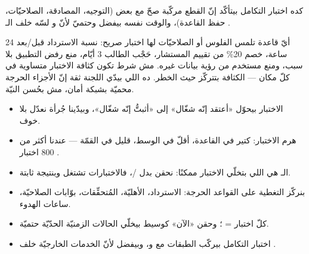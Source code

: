 كده اختبار التكامل بيتأكّد إنّ القطع مركّبة صحّ مع بعض (التوجيه، المصادقة، الصلاحيّات، حفظ القاعدة)، والوقت نفسه بيفضل  وحتميّ لأنّ  و لسّه خلف الـ .

\begin{spotlight}
أيّ قاعدة تلمس الفلوس أو الصلاحيّات لها اختبار صريح: نسبة الاسترداد قبل/بعد \textenglish{24} ساعة، خصم \textenglish{20}\% من تقييم المستشار، حَجْب الطالب \textenglish{3} أيّام، منع رفض التطبيق بلا سبب، ومنع مستخدم من رؤية بيانات غيره. مش شرط تكون كثافة الاختبار متساوية في كلّ مكان — الكثافة بتتركّز حيث الخطر. ده اللي بيدّي اللجنة ثقة إنّ الأجزاء الحرجة محميّة بشبكة أمان، مش بحُسن النيّة.
\end{spotlight}

\begin{summary}
\begin{itemize}
  \item الاختبار بيحوّل «أعتقد إنّه شغّال» إلى «أثبتُّ إنّه شغّال»، وبيدّينا جُرأة نعدّل بلا خوف.
  \item هرم الاختبار: كتير  في القاعدة، أقلّ  في الوسط، قليل  في القمّة — عندنا أكثر من \textenglish{800} اختبار .
  \item الـ  هي اللي بتخلّي الاختبار ممكنًا: نحقن  بدل /، فالاختبارات تشتغل  وبنتيجة ثابتة.
  \item بنركّز التغطية على القواعد الحرجة: الاسترداد، الأهليّة، المُتحقِّقات، بوّابات الصلاحيّة، ساعات الهدوء.
  \item كلّ اختبار = ؛ وحقن «الآن» كوسيط بيخلّي الحالات الزمنيّة الحدّيّة حتميّة.
  \item اختبار التكامل بيركّب الطبقات مع  و، وبيفضل  لأنّ الخدمات الخارجيّة خلف .
\end{itemize}
\end{summary}
